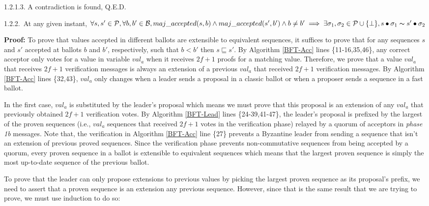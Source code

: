 \indent\indent\indent\indent\indent\indent\indent\parbox{\linewidth}{\strut1.2.1.3. A contradiction is found, Q.E.D. }\par
\indent\indent\indent\indent\indent\parbox{\linewidth-\algorithmicindent*5}{\strut1.2.2.~At any given instant, $\forall s,s' \in \mathcal{P},\forall b,b' \in \mathcal{B}, maj\_accepted(s,b) \land maj\_accepted(s',b') \land b \neq b' \implies \exists \sigma_1,\sigma_2 \in \mathcal{P} \cup \{\bot\}, s \bullet \sigma_1 \thicksim s' \bullet \sigma_2$} 
\indent\indent\indent\indent\indent\indent\parbox{\linewidth-\algorithmicindent*6}{\strut\textbf{Proof:} To prove that values accepted in different ballots are extensible to equivalent sequences, it suffices to prove that for any sequences $s$ and $s'$ accepted at ballots $b$ and $b'$, respectively, such that $b < b'$ then $s \sqsubseteq s'$. By Algorithm \ref{BFT-Acc} lines \{11-16,35,46\}, any correct acceptor only votes for a value in variable $val_a$ when it receives $2f+1$ proofs for a matching value. Therefore, we prove that a value $val_a$ that receives $2f+1$ verification messages is always an extension of a previous $val_a$ that received $2f+1$ verification messages. By Algorithm \ref{BFT-Acc} lines \{32,43\}, $val_a$ only changes when a leader sends a proposal in a classic ballot or when a proposer sends a sequence in a fast ballot.\strut}
\indent\indent\indent\indent\indent\indent\parbox{\linewidth-\algorithmicindent*6}{\strut In the first case, $val_a$ is substituted by the leader's proposal which means we must prove that this proposal is an extension of any $val_a$ that previously obtained $2f+1$ verification votes. By Algorithm \ref{BFT-Lead} lines \{24-39,41-47\}, the leader's proposal is prefixed by the largest of the proven sequences (i.e., $val_a$ sequences that received $2f+1$ votes in the verification phase) relayed by a quorum of acceptors in \textit{phase 1b} messages. Note that, the verification in Algorithm \ref{BFT-Acc} line \{27\} prevents a Byzantine leader from sending a sequence that isn't an extension of previous proved sequences. Since the verification phase prevents non-commutative sequences from being accepted by a quorum, every proven sequence in a ballot is extensible to equivalent sequences which means that the largest proven sequence is simply the most up-to-date sequence of the previous ballot. \strut}
\indent\indent\indent\indent\indent\indent\parbox{\linewidth-\algorithmicindent*6}{\strut To prove that the leader can only propose extensions to previous values by picking the largest proven sequence as its proposal's prefix, we need to assert that a proven sequence is an extension any previous sequence. However, since that is the same result that we are trying to prove, we must use induction to do so:\strut}
